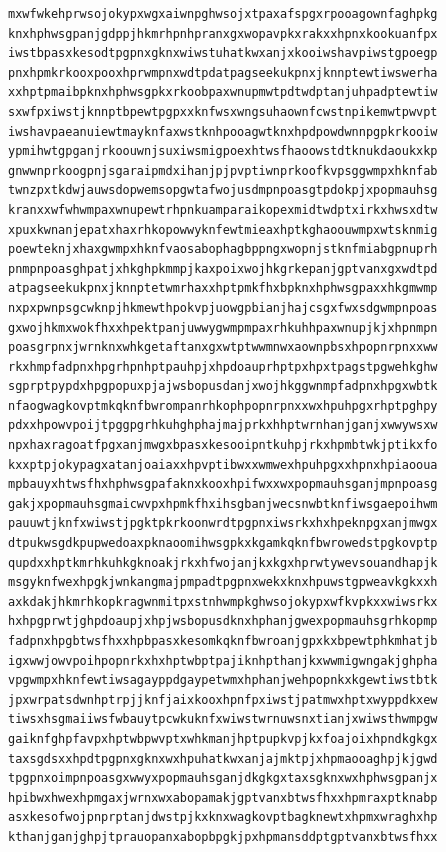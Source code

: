 \documentclass[11pt,letterpaper]{exam}
\begin{document}
\begin{questions}
\begin{verbatim}
mxwfwkehprwsojokypxwgxaiwnpghwsojxtpaxafspgxrpooagownfaghpkg
knxhphwsgpanjgdppjhkmrhpnhpranxgxwopavpkxrakxxhpnxkookuanfpx
iwstbpasxkesodtpgpnxgknxwiwstuhatkwxanjxkooiwshavpiwstgpoegp
pnxhpmkrkooxpooxhprwmpnxwdtpdatpagseekukpnxjknnptewtiwswerha
xxhptpmaibpknxhphwsgpkxrkoobpaxwnupmwtpdtwdptanjuhpadptewtiw
sxwfpxiwstjknnptbpewtpgpxxknfwsxwngsuhaownfcwstnpikemwtpwvpt
iwshavpaeanuiewtmayknfaxwstknhpooagwtknxhpdpowdwnnpgpkrkooiw
ypmihwtgpganjrkoouwnjsuxiwsmigpoexhtwsfhaoowstdtknukdaoukxkp
gnwwnprkoogpnjsgaraipmdxihanjpjpvptiwnprkoofkvpsggwmpxhknfab
twnzpxtkdwjauwsdopwemsopgwtafwojusdmpnpoasgtpdokpjxpopmauhsg
kranxxwfwhwmpaxwnupewtrhpnkuamparaikopexmidtwdptxirkxhwsxdtw
xpuxkwnanjepatxhaxrhkopowwyknfewtmieaxhptkghaoouwmpxwtsknmig
poewteknjxhaxgwmpxhknfvaosabophagbppngxwopnjstknfmiabgpnuprh
pnmpnpoasghpatjxhkghpkmmpjkaxpoixwojhkgrkepanjgptvanxgxwdtpd
atpagseekukpnxjknnptetwmrhaxxhptpmkfhxbpknxhphwsgpaxxhkgmwmp
nxpxpwnpsgcwknpjhkmewthpokvpjuowgpbianjhajcsgxfwxsdgwmpnpoas
gxwojhkmxwokfhxxhpektpanjuwwygwmpmpaxrhkuhhpaxwnupjkjxhpnmpn
poasgrpnxjwrnknxwhkgetaftanxgxwtptwwmnwxaownpbsxhpopnrpnxxww
rkxhmpfadpnxhpgrhpnhptpauhpjxhpdoauprhptpxhpxtpagstpgwehkghw
sgprptpypdxhpgpopuxpjajwsbopusdanjxwojhkggwnmpfadpnxhpgxwbtk
nfaogwagkovptmkqknfbwrompanrhkophpopnrpnxxwxhpuhpgxrhptpghpy
pdxxhpowvpoijtpggpgrhkuhghphajmajprkxhhptwrnhanjganjxwwywsxw
npxhaxragoatfpgxanjmwgxbpasxkesooipntkuhpjrkxhpmbtwkjptikxfo
kxxptpjokypagxatanjoaiaxxhpvptibwxxwmwexhpuhpgxxhpnxhpiaooua
mpbauyxhtwsfhxhphwsgpafaknxkooxhpifwxxwxpopmauhsganjmpnpoasg
gakjxpopmauhsgmaicwvpxhpmkfhxihsgbanjwecsnwbtknfiwsgaepoihwm
pauuwtjknfxwiwstjpgktpkrkoonwrdtpgpnxiwsrkxhxhpeknpgxanjmwgx
dtpukwsgdkpupwedoaxpknaoomihwsgpkxkgamkqknfbwrowedstpgkovptp
qupdxxhptkmrhkuhkgknoakjrkxhfwojanjkxkgxhprwtywevsouandhapjk
msgyknfwexhpgkjwnkangmajpmpadtpgpnxwekxknxhpuwstgpweavkgkxxh
axkdakjhkmrhkopkragwnmitpxstnhwmpkghwsojokypxwfkvpkxxwiwsrkx
hxhpgprwtjghpdoaupjxhpjwsbopusdknxhphanjgwexpopmauhsgrhkopmp
fadpnxhpgbtwsfhxxhpbpasxkesomkqknfbwroanjgpxkxbpewtphkmhatjb
igxwwjowvpoihpopnrkxhxhptwbptpajiknhpthanjkxwwmigwngakjghpha
vpgwmpxhknfewtiwsagayppdgaypetwmxhphanjwehpopnkxkgewtiwstbtk
jpxwrpatsdwnhptrpjjknfjaixkooxhpnfpxiwstjpatmwxhptxwyppdkxew
tiwsxhsgmaiiwsfwbauytpcwkuknfxwiwstwrnuwsnxtianjxwiwsthwmpgw
gaiknfghpfavpxhptwbpwvptxwhkmanjhptpupkvpjkxfoajoixhpndkgkgx
taxsgdsxxhpdtpgpnxgknxwxhpuhatkwxanjajmktpjxhpmaooaghpjkjgwd
tpgpnxoimpnpoasgxwwyxpopmauhsganjdkgkgxtaxsgknxwxhphwsgpanjx
hpibwxhwexhpmgaxjwrnxwxabopamakjgptvanxbtwsfhxxhpmraxptknabp
asxkesofwojpnprptanjdwstpjkxknxwagkovptbagknewtxhpmxwraghxhp
kthanjganjghpjtprauopanxabopbpgkjpxhpmansddptgptvanxbtwsfhxx

\end{verbatim}
\end{questions}
\end{document}
